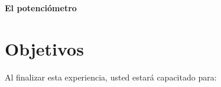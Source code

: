 \thispagestyle{fancy}
\begin{center}
	\LARGE{\textbf{El potenciómetro}}
\end{center}
\section{Objetivos}
Al finalizar esta experiencia, usted estará capacitado para: